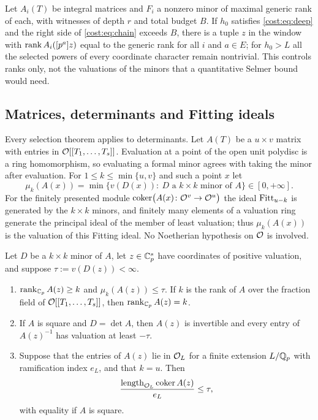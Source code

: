 \begin{remark}\label{cost:rem:nonunitrank}
Let $A_i(T)$ be integral matrices and $F_i$ a nonzero minor of maximal generic rank of each,
with witnesses of depth $r$ and total budget $B$. If $h_0$ satisfies \eqref{cost:eq:deep}
and the right side of \eqref{cost:eq:chain} exceeds $B$, there is a tuple $z$ in the window
with $\operatorname{rank} A_i([p^a]z)$ equal to the generic rank for all $i$ and $a\in E$; for $h_0>L$ all
the selected powers of every coordinate character remain nontrivial. This controls ranks
only, not the valuations of the minors that a quantitative Selmer bound would need.
\end{remark}

\subsection{Matrices, determinants and Fitting ideals}\label{tors:sec:matrices}

Every selection theorem applies to determinants. Let $A(T)$ be a $u\times v$ matrix with
entries in $\mathcal{O}[[T_1,\dots,T_s]]$. Evaluation at a point of the open unit polydisc is a
ring homomorphism, so evaluating a formal minor agrees with taking the minor after
evaluation. For $1\le k\le\min\{u,v\}$ and such a point $x$ let
\[
  \mu_k(A(x))=\min\bigl\{v(D(x)):\ D\text{ a }k\times k\text{ minor of }A\bigr\}\in[0,+\infty].
\]
For the finitely presented module $\operatorname{coker}\bigl(A(x)\colon\mathcal{O}^v\to\mathcal{O}^u\bigr)$ the ideal
$\operatorname{Fitt}_{u-k}$ is generated by the $k\times k$ minors, and finitely many elements of a
valuation ring generate the principal ideal of the member of least valuation; thus
$\mu_k(A(x))$ is the valuation of this Fitting ideal. No Noetherian hypothesis on $\mathcal{O}$ is
involved.

\begin{proposition}\label{tors:prop:matrices}
Let $D$ be a $k\times k$ minor of $A$, let $z\in\mathbb{C}_p^s$ have coordinates of positive
valuation, and suppose $\tau:=v(D(z))<\infty$.
\begin{enumerate}[label=\textup{(\alph*)}]
\item $\operatorname{rank}_{\mathbb{C}_p}A(z)\ge k$ and $\mu_k(A(z))\le\tau$. If $k$ is the rank of $A$ over the
  fraction field of $\mathcal{O}[[T_1,\dots,T_s]]$, then $\operatorname{rank}_{\mathbb{C}_p}A(z)=k$.
\item If $A$ is square and $D=\det A$, then $A(z)$ is invertible and every entry of
  $A(z)^{-1}$ has valuation at least $-\tau$.
\item Suppose that the entries of $A(z)$ lie in $\mathcal{O}_L$ for a finite extension $L/\mathbb{Q}_p$
  with ramification index $e_L$, and that $k=u$. Then
  \[
    \frac{\operatorname{length}_{\mathcal{O}_L}\operatorname{coker} A(z)}{e_L}\le\tau,
  \]
  with equality if $A$ is square.
\end{enumerate}
\end{proposition}


